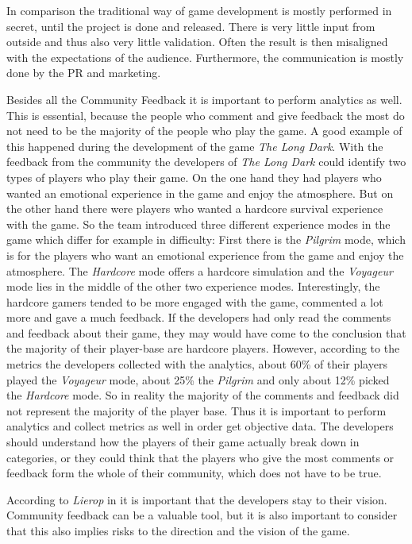 In comparison the traditional way of game development is mostly performed in secret, until the project is done and released. There is very little input from outside and thus also very little validation. Often the result is then misaligned with the expectations of the audience. Furthermore, the communication is mostly done by the PR and marketing.\citep{lierop_community_2015}

Besides all the Community Feedback it is important to perform analytics as well. This is essential, because the people who comment and give feedback the most do not need to be the majority of the people who play the game. A good example of this happened during the development of the game \textit{The Long Dark}. With the feedback from the community the developers of \textit{The Long Dark} could identify two types of players who play their game. On the one hand they had players who wanted an emotional experience in the game and enjoy the atmosphere. But on the other hand there were players who wanted a hardcore survival experience with the game. So the team introduced three different experience modes in the game which differ for example in difficulty: First there is the \textit{Pilgrim} mode, which is for the players who want an emotional experience from the game and enjoy the atmosphere. The \textit{Hardcore} mode offers a hardcore simulation and the \textit{Voyageur} mode lies in the middle of the other two experience modes. Interestingly, the hardcore gamers tended to be more engaged with the game, commented a lot more and gave a much feedback. If the developers had only read the comments and feedback about their game, they may would have come to the conclusion that the majority of their player-base are hardcore players. However, according to the metrics the developers collected with the analytics, about 60\% of their players played the \textit{Voyageur} mode, about 25\% the \textit{Pilgrim} and only about 12\% picked the \textit{Hardcore} mode. So in reality the majority of the comments and feedback did not represent the majority of the player base. Thus it is important to perform analytics and collect metrics as well in order get objective data. The developers should understand how the players of their game actually break down in categories, or they could think that the players who give the most comments or feedback form the whole of their community, which does not have to be true.\citep{lierop_community_2015}

According to \textit{Lierop} in \citep{lierop_community_2015} it is important that the developers stay to their vision. Community feedback can be a valuable tool, but it is also important to consider that this also implies risks to the direction and the vision of the game.\citep{lierop_community_2015}

